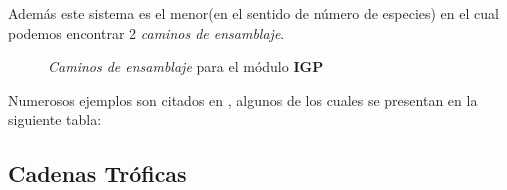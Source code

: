 Adem\'as este sistema es el menor(en el sentido de n\'umero de especies) en el cual podemos encontrar 2 \emph{caminos de ensamblaje}.
\begin{figure}[h]

\caption{\emph{Caminos de ensamblaje} para el m\'odulo \textbf{IGP}}
\label{fig:IGPAssembly}
\end{figure}
Numerosos ejemplos son citados en \cite{polis1989ecology}, algunos de los cuales se presentan en la siguiente tabla:

\subsection{Cadenas Tr\'oficas}


